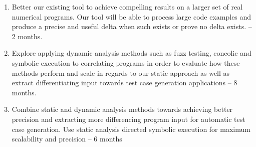 \begin{enumerate}
\item Better our existing tool to achieve compelling results on a larger set of real numerical programs. Our tool will be able to process large code examples and produce a precise and useful delta when such exists or prove no delta exists. -- 2 months.
\item Explore applying dynamic analysis methods such as fuzz testing, concolic and symbolic execution to correlating programs in order to evaluate how these methods perform and scale in regards to our static approach as well as extract differentiating input towards test case generation applications -- 8 months.
\item Combine static and dynamic analysis methods towards achieving better precision and extracting more differencing program input for automatic test case generation. Use static analysis directed symbolic execution for maximum scalability and precision -- 6 months
\end{enumerate} 